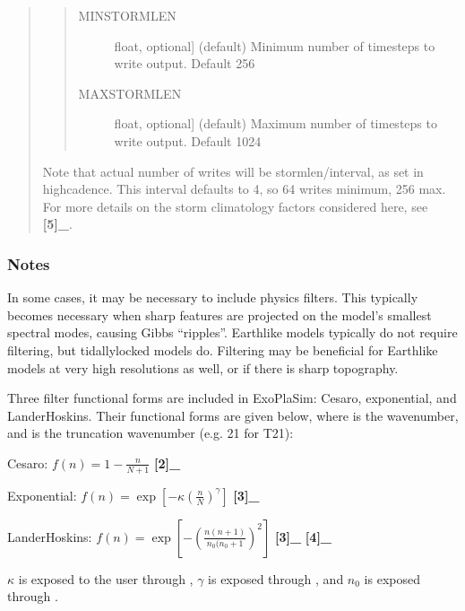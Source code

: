 \documentclass[letterpaper,10pt,english]{sphinxmanual}
\begin{document}
\begin{fulllineitems}
\begin{fulllineitems}
\begin{quote}
\begin{quote}
\begin{description}
\begin{description}
\begin{description}
\item[{MINSTORMLEN}] \leavevmode{[}float, optional{]}
(default) Minimum number of timesteps to write output. Default 256

\item[{MAXSTORMLEN}] \leavevmode{[}float, optional{]}
(default) Maximum number of timesteps to write output. Default 1024

\end{description}

\end{description}

\end{description}
\end{quote}

Note that actual number of writes will be stormlen/interval, as set in highcadence. This interval defaults to 4, so 64 writes minimum, 256 max. For more details on the storm climatology factors considered here, see {\color{red}\bfseries{}{[}5{]}\_}.
\end{quote}
\subsubsection*{Notes}

In some cases, it may be necessary to include physics filters. This typically becomes
necessary when sharp features are projected on the model’s smallest spectral modes, causing
Gibbs “ripples”. Earth\sphinxhyphen{}like models typically do not require filtering, but tidally\sphinxhyphen{}locked
models do. Filtering may be beneficial for Earth\sphinxhyphen{}like models at very high resolutions as well,
or if there is sharp topography.

Three filter functional forms are included in ExoPlaSim: Cesaro, exponential, and Lander\sphinxhyphen{}Hoskins. Their functional forms are given below, where  is the wavenumber, and  is the
truncation wavenumber (e.g. 21 for T21):

Cesaro: \(f(n)=1-\frac{n}{N+1}\) {\color{red}\bfseries{}{[}2{]}\_}

Exponential: \(f(n)=\exp\left[-\kappa\left(\frac{n}{N}\right)^\gamma\right]\) {\color{red}\bfseries{}{[}3{]}\_}

Lander\sphinxhyphen{}Hoskins: \(f(n)=\exp\left[-\left(\frac{n(n+1)}{n_0(n_0+1}\right)^2\right]\) {\color{red}\bfseries{}{[}3{]}\_} {\color{red}\bfseries{}{[}4{]}\_}

\(\kappa\) is exposed to the user through ,
\(\gamma\) is exposed through , and \(n_0\) is
exposed through .


\end{fulllineitems}
\end{fulllineitems}
\end{document}
